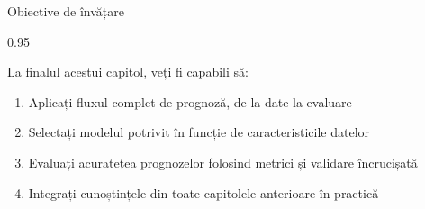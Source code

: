\documentclass[9pt, aspectratio=169, t]{beamer}
\subtitle{Capitolul 10: Recapitulare Comprehensivă}
\begin{document}
{
\begin{frame}
    \titlepage
\end{frame}
}

\begin{frame}{Obiective de învățare}
    \begin{cminipage}{0.95\textwidth}
        \begin{block}{La finalul acestui capitol, veți fi capabili să:}
            \begin{enumerate}\setlength{\itemsep}{0pt}
                \item Aplicați fluxul complet de prognoză, de la date la evaluare
                \item Selectați modelul potrivit în funcție de caracteristicile datelor
                \item Evaluați acuratețea prognozelor folosind metrici și validare încrucișată
                \item Integrați cunoștințele din toate capitolele anterioare în practică
            \end{enumerate}
        \end{block}
    \end{cminipage}
\end{frame}
\end{document}
